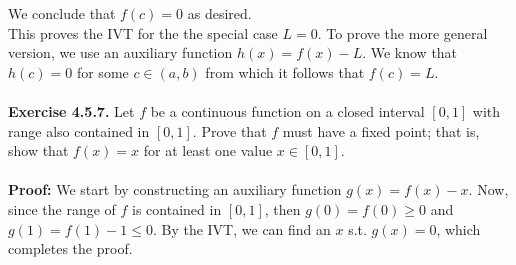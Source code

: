 \documentclass{article}
\begin{document}
	We conclude that $f(c) = 0$ as desired. \\ 
	This proves the IVT for the the special case $L = 0$. To prove the more general version, we use an auxiliary function $h(x) = f(x) - L$. We know that $h(c) = 0$ for some $c \in (a, b)$ from which it follows that $f(c) = L$. \\ \\
	\textbf{Exercise 4.5.7.} Let $f$ be a continuous function on a closed interval $[0, 1]$ with range also contained in $[0, 1]$. Prove that $f$ must have a fixed point; that is, show that $f(x) = x$ for at least one value $x \in [0, 1]$. \\ \\
	\textbf{Proof:} We start by constructing an auxiliary function $g(x) = f(x) - x$. Now, since the range of $f$ is contained in $[0, 1]$, then $g(0) = f(0) \geq 0$ and $g(1) = f(1) - 1 \leq 0$. By the IVT, we can find an $x$ s.t. $g(x) = 0$, which completes the proof.
\end{document}
